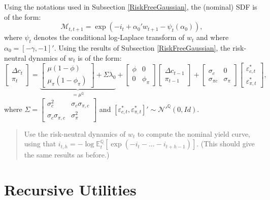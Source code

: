 \documentclass[
  12pt,
]{book}
\theoremstyle{definition}
\theoremstyle{definition}
\theoremstyle{definition}
\theoremstyle{definition}
\theoremstyle{remark}
\begin{document}
Using the notations used in Subsection \ref{RiskFreeGaussian}, the (nominal) SDF is of the form:
\[
\mathcal{M}_{t,t+1} = \exp(-i_t + \alpha_0'w_{t+1} - \psi_{t}(\alpha_0)),
\]
where \(\psi_t\) denotes the conditional log-Laplace transform of \(w_t\) and where \(\alpha_0 = [-\gamma,-1]'\). Using the results of Subsection \ref{RiskFreeGaussian}, the risk-neutral dynamics of \(w_t\) is of the form:
\[
\left[\begin{array}{c}\Delta c_t\\
\pi_t\end{array}\right] = 
\underbrace{\left[\begin{array}{c} \mu (1-\phi)\\
\mu_\pi(1-\phi_\pi)\end{array}\right]+\Sigma \lambda_0}_{=\mu^{\mathbb{Q}}}+
\left[\begin{array}{cc} \phi & 0\\
0 & \phi_\pi\end{array}\right]\left[\begin{array}{c}\Delta c_{t-1}\\
\pi_{t-1}\end{array}\right]+
\left[\begin{array}{cc} \sigma_c & 0\\
\sigma_{\pi c} & \sigma_\pi\end{array}\right]\left[\begin{array}{c}\varepsilon_{c,t}^*\\
\varepsilon_{\pi,t}^*\end{array}\right],
\]
where \(\Sigma = \left[\begin{array}{cc}\sigma_c^2&\sigma_c\sigma_{\pi,c}\\ \sigma_c\sigma_{\pi,c}&\sigma_{\pi}^2 \end{array}\right]\) and \([\varepsilon_{c,t}^*,\varepsilon_{\pi,t}^*]'\sim \mathcal{N}'^{\mathbb{Q}}(0,Id)\).

\begin{quote}
Use the risk-neutral dynamics of \(w_t\) to compute the nominal yield curve, using that \(i_{t,h} = - \log \mathbb{E}^{\mathbb{Q}}_t [\exp(-i_t - \dots - i_{t+h-1})]\). (This should give the same results as before.)
\end{quote}

\hypertarget{recursive-utilities}{%
\section{Recursive Utilities}\label{recursive-utilities}}
\end{document}
